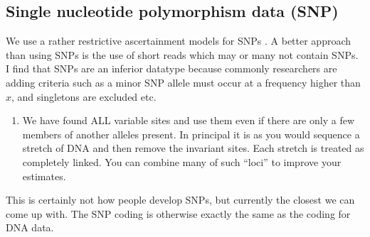 \subsection{Single nucleotide polymorphism data (SNP)}
We use a rather restrictive ascertainment 
models for SNPs \cite{kuhner:2000:usn}. A better approach than using SNPs is the use of short reads which may or many not contain SNPs. I find that SNPs are an inferior datatype because commonly researchers are adding criteria such as a minor SNP allele must occur at a frequency higher than $x$, and singletons are excluded etc. 
\begin{enumerate}
\item We have
found ALL variable sites and use them even if there are only a few
members of another alleles present. In principal it is as you would
sequence a stretch of DNA and then remove the invariant sites.
Each stretch is treated as completely linked. You can combine many of 
such ``loci'' to improve your estimates.
\end{enumerate}
This is certainly not how people develop SNPs, but currently the closest
we can come up with.
The SNP coding is otherwise exactly the same as the coding for DNA data.
\par

